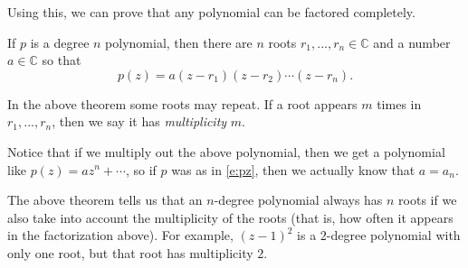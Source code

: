\documentclass[11pt,dvipsnames]{book}
\numberwithin{equation}{section} %
\numberwithin{figure}{section} %
\numberwithin{table}{section} %
\begin{document}
Using this, we can prove that any polynomial can be factored completely.

\begin{theorem}
If $p$ is a degree $n$ polynomial, then there are $n$ roots $r_{1},...,r_{n}\in\mathbb{C}$ and a number $a\in\mathbb{C}$ so that
\[
p(z) = a(z-r_{1})(z-r_{2})\cdots (z-r_{n}).\]
\end{theorem}
In the above theorem some roots may repeat. If a root appears $m$ times in $r_{1},...,r_{n}$, then we say it has {\it multiplicity} $m$. 

Notice that if we multiply out the above polynomial, then we get a polynomial like $p(z)=az^{n}+\cdots $, so if $p$ was as in \eqref{e:pz}, then we actually know that $a=a_n$. 

The above theorem tells us that an $n$-degree polynomial always has $n$ roots if we also take into account the multiplicity of the roots (that is, how often it appears in the factorization above). For example, $(z-1)^2$ is a $2$-degree polynomial with only one root, but that root has multiplicity $2$. 
\end{document}

